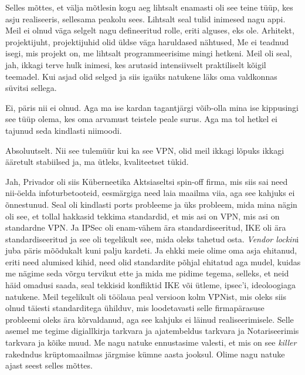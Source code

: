 
Selles mõttes, et välja mõtlesin kogu aeg lihtsalt enamasti oli see teine tüüp, 
kes asju realiseeris,  sellesama peakolu sees. Lihtsalt seal tulid inimesed 
nagu appi. Meil ei olnud  väga selgelt nagu defineeritud rolle, eriti alguses, 
eks ole. Arhitekt, projektijuht, projektijuhid olid üldse väga haruldased 
nähtused, Me ei teadnud isegi, mis projekt on, me lihtsalt programmeerisime 
mingi hetkeni. Meil oli seal, jah, ikkagi terve hulk inimesi, kes arutasid 
intensiivselt praktiliselt kõigil teemadel. Kui asjad olid selged ja siis 
igaüks natukene läks oma  valdkonnas  süvitsi sellega.


Ei, päris nii ei olnud. Aga ma ise kardan tagantjärgi võib-olla mina ise 
kippusingi see tüüp olema, kes oma  arvamust teistele peale surus. Aga ma tol 
hetkel ei tajunud seda kindlasti niimoodi. 


Absoluutselt. Nii see tulemüür kui ka see VPN, olid meil ikkagi lõpuks ikkagi 
ääretult stabiilsed ja, ma ütleks, kvaliteetset tükid. 

Jah, Privador oli siis Küberneetika Aktsiaseltsi spin-off 
firma, mis siis sai need nii-öelda infoturbetooteid, eesmärgiga need laia 
maailma viia, aga see kahjuks ei õnnestunud. Seal oli  kindlasti ports 
probleeme ja üks probleem, mida mina nägin oli see, et tollal hakkasid tekkima 
standardid, et mis asi on VPN, mis asi on standardne VPN. Ja IPSec oli 
enam-vähem ära standardiseeritud, IKE oli ära standardiseeritud ja see oli 
tegelikult see, mida oleks tahetud osta. \emph{Vendor lockin}i juba päris 
mõõdukalt kuni palju kardeti. Ja ehkki meie olime oma asja ehitanud, eriti need 
alumised kihid, need olid  standardite põhjal ehitatud aga mudel,  kuidas me 
nägime seda võrgu tervikut ette ja mida me pidime tegema, selleks, et neid häid 
omadusi saada,  seal tekkisid konfliktid IKE või ütleme, ipsec'i, ideoloogiaga 
natukene. Meil  tegelikult oli töölaua peal  versioon kolm VPNist, mis oleks 
siis olnud täiesti standarditega ühilduv, mis loodetavasti selle  firmapärasuse 
probleemi oleks ära kõrvaldanud, aga see kahjuks ei läinud realiseerimisele. 
Selle asemel me tegime digiallkirja tarkvara ja ajatembeldus tarkvara ja 
Notariseerimis tarkvara ja kõike muud. Me nagu natuke ennustasime valesti, et 
mis on see \emph{killer} rakedndus krüptomaailmas järgmise kümne aasta jooksul. 
Olime nagu natuke ajast seest selles mõttes.

